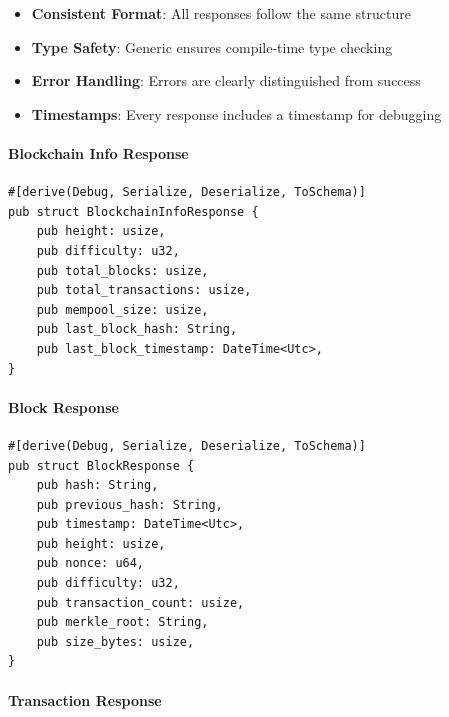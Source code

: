 \begin{itemize}
  \item \textbf{Consistent Format}: All responses follow the same structure
  \item \textbf{Type Safety}: Generic  ensures compile-time type checking
  \item \textbf{Error Handling}: Errors are clearly distinguished from success
  \item \textbf{Timestamps}: Every response includes a timestamp for debugging
\end{itemize}

\paragraph{Blockchain Info Response}

\begin{listing}[H]
\caption{Blockchain information response model}
\label{lst:models-blockchain-response}
\begin{verbatim}
#[derive(Debug, Serialize, Deserialize, ToSchema)]
pub struct BlockchainInfoResponse {
    pub height: usize,
    pub difficulty: u32,
    pub total_blocks: usize,
    pub total_transactions: usize,
    pub mempool_size: usize,
    pub last_block_hash: String,
    pub last_block_timestamp: DateTime<Utc>,
}
\end{verbatim}
\end{listing}

\paragraph{Block Response}

\begin{listing}[H]
\caption{Block response model}
\label{lst:models-block-response}
\begin{verbatim}
#[derive(Debug, Serialize, Deserialize, ToSchema)]
pub struct BlockResponse {
    pub hash: String,
    pub previous_hash: String,
    pub timestamp: DateTime<Utc>,
    pub height: usize,
    pub nonce: u64,
    pub difficulty: u32,
    pub transaction_count: usize,
    pub merkle_root: String,
    pub size_bytes: usize,
}
\end{verbatim}
\end{listing}

\paragraph{Transaction Response}

